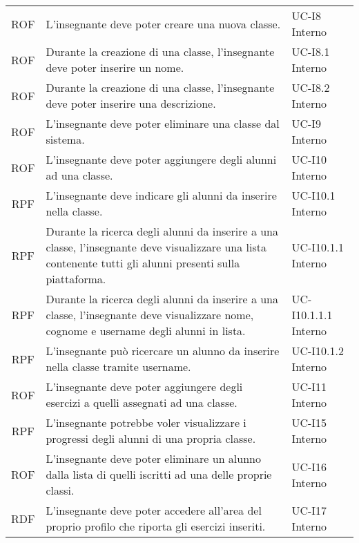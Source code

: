 \begin{tabularx}{\textwidth}{| c | p{10cm} | X |}
		ROF & L'insegnante deve poter creare una nuova classe. & UC-I8 \newline Interno\\
		ROF & Durante la creazione di una classe, l'insegnante deve poter inserire un nome. & UC-I8.1 \newline Interno\\
				ROF & Durante la creazione di una classe, l'insegnante deve poter inserire una descrizione. & UC-I8.2 \newline Interno\\
		ROF & L'insegnante deve poter eliminare una classe dal sistema. & UC-I9 \newline Interno\\
		ROF & L'insegnante deve poter aggiungere degli alunni ad una classe. & UC-I10 \newline Interno\\
		RPF & L'insegnante deve indicare gli alunni da inserire nella classe. & UC-I10.1 \newline Interno\\
		RPF & Durante la ricerca degli alunni da inserire a una classe, l'insegnante deve visualizzare una lista contenente tutti gli alunni presenti sulla piattaforma. & UC-I10.1.1 \newline Interno\\
		RPF & Durante la ricerca degli alunni da inserire a una classe, l'insegnante deve visualizzare nome, cognome e username degli alunni in lista. & UC-I10.1.1.1 \newline Interno\\
		RPF & L'insegnante può ricercare un alunno da inserire nella classe tramite username. & UC-I10.1.2 \newline Interno\\
		ROF & L'insegnante deve poter aggiungere degli esercizi a quelli assegnati ad una classe. & UC-I11 \newline Interno\\
		RPF & L'insegnante potrebbe voler visualizzare i progressi degli alunni di una propria classe. & UC-I15 \newline Interno\\
		ROF & L'insegnante deve poter eliminare un alunno dalla lista di quelli iscritti ad una delle proprie classi. & UC-I16 \newline Interno\\
		RDF & L'insegnante deve poter accedere all'area del proprio profilo che riporta gli esercizi inseriti. & UC-I17 \newline Interno\\

\end{tabularx}
